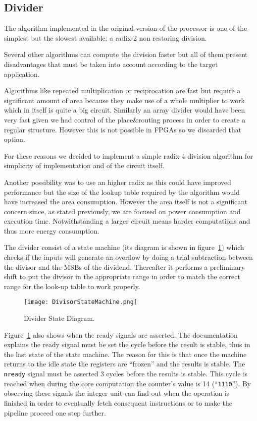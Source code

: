 \subsection{Divider}
\label{sec:div}


The algorithm implemented in the original version of the processor is one of the simplest but the
slowest available: a radix-2 non restoring division.

Several other algorithms can compute the division faster but all of them present disadvantages
that must be taken into account according to the target application.

Algorithms like repeated multiplication or reciprocation are fast but require a significant amount
of area because they make use of a whole multiplier to work which in itself is quite a big circuit.
Similarly an array divider would have been very fast given we had control of the
place\&routing process in order to create a regular structure. However this is not possible in FPGAs so we discarded that option. 

For these reasons we decided to implement
a simple radix-4 division algorithm for simplicity of implementation and of the circuit itself.

Another possibility was to use an higher radix as this could have improved performance but the size of the lookup table required
by the algorithm would have increased the area consumption.
However the area itself is not a significant concern since, as stated previously, we are focused on power consumption and execution time. Notwithstanding a larger circuit means harder computations and thus more energy consumption.

The divider consist of a state machine (its diagram is shown in figure~\ref{fig:div_state_dia}) which checks if the inputs will
generate an overflow by doing a trial subtraction between the divisor and the MSBs of the dividend. Thereafter it performs a preliminary shift to put the divisor in the appropriate range in order to match the correct range for the look-up table to work properly.


\begin{figure}[H]
\centering
\texttt{[image: DivisorStateMachine.png]}
\caption{Divider State Diagram.}
\label{fig:div_state_dia}
\end{figure}

Figure~\ref{fig:div_state_dia} also shows when the ready signals are asserted. The documentation~\cite{doc} explains the ready signal must be set the cycle before the result is stable, thus in the last state of the state machine. The reason for this is that once the machine returns to the idle state the registers are ``frozen'' and the results is stable. The \texttt{nready} signal must be asserted 3 cycles before the results is stable. This cycle is reached when during the core computation the counter's value is 14 (``\texttt{1110}''). 
By observing these signals the integer unit can find out when the operation is finished in order to eventually fetch consequent instructions or to make the pipeline proceed one step further.

